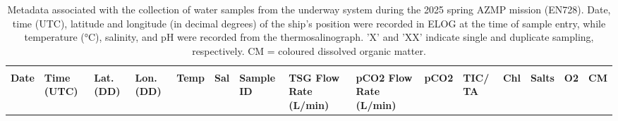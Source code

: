 \documentclass[12pt]{article}\usepackage[]{graphicx}\usepackage[]{color}
\begin{document}
\clearpage

\pagestyle{empty}
\begin{landscape}
\begin{longtable}[t]{l>{\raggedright\arraybackslash}p{4em}>{\raggedright\arraybackslash}p{4em}>{\raggedright\arraybackslash}p{4em}ll>{\raggedright\arraybackslash}p{4em}>{\raggedright\arraybackslash}p{4em}>{\raggedright\arraybackslash}p{4em}>{\raggedright\arraybackslash}p{2em}>{\raggedright\arraybackslash}p{1.5em}>{\raggedright\arraybackslash}p{1.5em}lll}
\caption{\label{tab:table7}Metadata associated with the collection of water samples from the underway system during the 2025 spring AZMP mission (EN728). Date, time (UTC), latitude and longitude (in decimal degrees) of the ship's position were recorded in ELOG at the time of sample entry, while temperature (°C), salinity, and pH were recorded from the thermosalinograph. 'X' and 'XX' indicate single and duplicate sampling, respectively. CM = coloured dissolved organic matter.}\\
\toprule
\multicolumn{1}{c}{\bgroup\fontsize{12}{14}\selectfont \textbf{ }\egroup{}} & \multicolumn{1}{c}{\bgroup\fontsize{12}{14}\selectfont \textbf{ }\egroup{}} & \multicolumn{1}{c}{\bgroup\fontsize{12}{14}\selectfont \textbf{ }\egroup{}} & \multicolumn{1}{c}{\bgroup\fontsize{12}{14}\selectfont \textbf{ }\egroup{}} & \multicolumn{1}{c}{\bgroup\fontsize{12}{14}\selectfont \textbf{ }\egroup{}} & \multicolumn{1}{c}{\bgroup\fontsize{12}{14}\selectfont \textbf{ }\egroup{}} & \multicolumn{1}{c}{\bgroup\fontsize{12}{14}\selectfont \textbf{ }\egroup{}} & \multicolumn{1}{c}{\bgroup\fontsize{12}{14}\selectfont \textbf{ }\egroup{}} & \multicolumn{1}{c}{\bgroup\fontsize{12}{14}\selectfont \textbf{ }\egroup{}} & \multicolumn{6}{c}{\bgroup\fontsize{12}{14}\selectfont \textbf{Bottle Samples}\egroup{}} \\
\cmidrule(l{3pt}r{3pt}){10-15}
\begingroup\fontsize{11}{13}\selectfont \textbf{Date}\endgroup & \begingroup\fontsize{11}{13}\selectfont \textbf{Time (UTC)}\endgroup & \begingroup\fontsize{11}{13}\selectfont \textbf{Lat. (DD)}\endgroup & \begingroup\fontsize{11}{13}\selectfont \textbf{Lon. (DD)}\endgroup & \begingroup\fontsize{11}{13}\selectfont \textbf{Temp}\endgroup & \begingroup\fontsize{11}{13}\selectfont \textbf{Sal}\endgroup & \begingroup\fontsize{11}{13}\selectfont \textbf{Sample ID}\endgroup & \begingroup\fontsize{11}{13}\selectfont \textbf{TSG Flow Rate (L/min)}\endgroup & \begingroup\fontsize{11}{13}\selectfont \textbf{pCO2 Flow Rate (L/min)}\endgroup & \begingroup\fontsize{11}{13}\selectfont \textbf{pCO2}\endgroup & \begingroup\fontsize{11}{13}\selectfont \textbf{TIC/ TA}\endgroup & \begingroup\fontsize{11}{13}\selectfont \textbf{Chl}\endgroup & \begingroup\fontsize{11}{13}\selectfont \textbf{Salts}\endgroup & \begingroup\fontsize{11}{13}\selectfont \textbf{O2}\endgroup & \begingroup\fontsize{11}{13}\selectfont \textbf{CM}\endgroup\\

\end{longtable}
\end{landscape}
\end{document}
